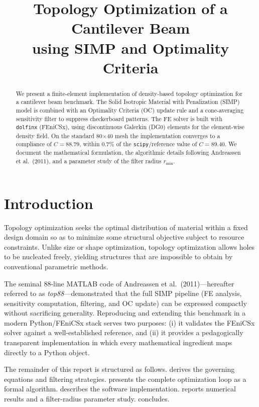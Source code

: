 \documentclass[11pt,a4paper]{article}
\title{Topology Optimization of a Cantilever Beam\\
       using SIMP and Optimality Criteria}
\author{}
\date{}
\begin{document}
\maketitle

\begin{abstract}
We present a finite-element implementation of density-based topology
optimization for a cantilever beam benchmark.  The Solid Isotropic
Material with Penalization (SIMP) model is combined with an Optimality
Criteria (OC) update rule and a cone-averaging sensitivity filter to
suppress checkerboard patterns.  The FE solver is built with
\texttt{dolfinx} (FEniCSx), using discontinuous Galerkin (DG0) elements
for the element-wise density field.  On the standard 80$\times$40 mesh
the implementation converges to a compliance of $C = 88.79$, within
$0.7\%$ of the \texttt{scipy}/reference value of $C = 89.40$.  We
document the mathematical formulation, the algorithmic details following
Andreassen et al.\ (2011), and a parameter study of the filter radius
$r_\mathrm{min}$.
\end{abstract}

\section{Introduction}
\label{sec:introduction}

Topology optimization seeks the optimal distribution of material within a
fixed design domain so as to minimize some structural objective subject to
resource constraints.  Unlike size or shape optimization, topology
optimization allows holes to be nucleated freely, yielding structures that
are impossible to obtain by conventional parametric methods.

The seminal 88-line MATLAB code of Andreassen et al.\ (2011)---hereafter
referred to as \emph{top88}---demonstrated that the full SIMP pipeline
(FE analysis, sensitivity computation, filtering, and OC update) can be
expressed compactly without sacrificing generality.  Reproducing and
extending this benchmark in a modern Python/FEniCSx stack serves two
purposes: (i) it validates the FEniCSx solver against a well-established
reference, and (ii) it provides a pedagogically transparent implementation
in which every mathematical ingredient maps directly to a Python object.

The remainder of this report is structured as follows.  
derives the governing equations and filtering strategies.  
presents the complete optimization loop as a formal algorithm.
 describes the software implementation.
 reports numerical results and a filter-radius parameter
study.   concludes.
\end{document}
